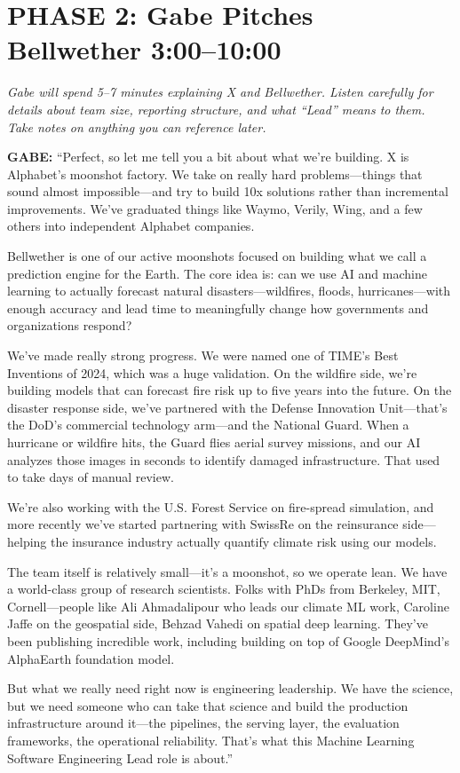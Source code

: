 \documentclass[11pt,letterpaper]{article}
\newenvironment{gabe}{\begin{mdframed}[backgroundcolor=gabebg,linewidth=0pt,innertopmargin=8pt,innerbottommargin=8pt]\textbf{\color{xred}GABE:} }{\end{mdframed}}
\newcommand{\stage}[1]{{\small\color{xgray}\textit{#1}}}
\begin{document}
\section*{PHASE 2: Gabe Pitches Bellwether \hfill {\color{xgray}\normalsize 3:00--10:00}}

\stage{Gabe will spend 5--7 minutes explaining X and Bellwether. Listen carefully for details about team size, reporting structure, and what ``Lead'' means to them. Take notes on anything you can reference later.}

\begin{gabe}
``Perfect, so let me tell you a bit about what we're building. X is Alphabet's moonshot factory. We take on really hard problems---things that sound almost impossible---and try to build 10x solutions rather than incremental improvements. We've graduated things like Waymo, Verily, Wing, and a few others into independent Alphabet companies.

Bellwether is one of our active moonshots focused on building what we call a prediction engine for the Earth. The core idea is: can we use AI and machine learning to actually forecast natural disasters---wildfires, floods, hurricanes---with enough accuracy and lead time to meaningfully change how governments and organizations respond?

We've made really strong progress. We were named one of TIME's Best Inventions of 2024, which was a huge validation. On the wildfire side, we're building models that can forecast fire risk up to five years into the future. On the disaster response side, we've partnered with the Defense Innovation Unit---that's the DoD's commercial technology arm---and the National Guard. When a hurricane or wildfire hits, the Guard flies aerial survey missions, and our AI analyzes those images in seconds to identify damaged infrastructure. That used to take days of manual review.

We're also working with the U.S. Forest Service on fire-spread simulation, and more recently we've started partnering with SwissRe on the reinsurance side---helping the insurance industry actually quantify climate risk using our models.

The team itself is relatively small---it's a moonshot, so we operate lean. We have a world-class group of research scientists. Folks with PhDs from Berkeley, MIT, Cornell---people like Ali Ahmadalipour who leads our climate ML work, Caroline Jaffe on the geospatial side, Behzad Vahedi on spatial deep learning. They've been publishing incredible work, including building on top of Google DeepMind's AlphaEarth foundation model.

But what we really need right now is engineering leadership. We have the science, but we need someone who can take that science and build the production infrastructure around it---the pipelines, the serving layer, the evaluation frameworks, the operational reliability. That's what this Machine Learning Software Engineering Lead role is about.''
\end{gabe}
\end{document}
